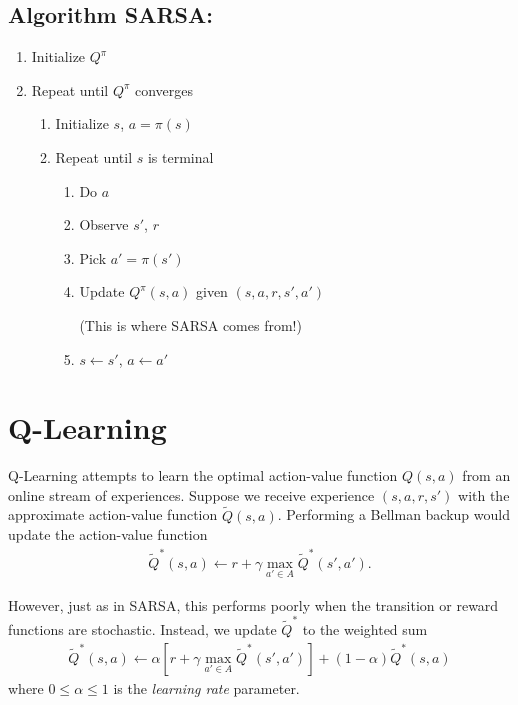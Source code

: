 \documentclass[11pt]{article}
\numberwithin{equation}{section}
\numberwithin{figure}{section}
\begin{document}
\subsection*{Algorithm SARSA:}
\begin{enumerate}
	\item Initialize $Q^\pi$
	\item Repeat until $Q^\pi$ converges
	\begin{enumerate}
		\item Initialize $s$, $a = \pi(s)$
		\item Repeat until $s$ is terminal
		\begin{enumerate}
			\item Do $a$
			\item Observe $s'$, $r$
			\item Pick $a' = \pi(s')$
			\item Update $Q^\pi(s,a)$ given $(s, a, r, s', a')$
			
			(This is where SARSA comes from!)
			\item $s \leftarrow s'$, $a \leftarrow a'$ 
		\end{enumerate}
	\end{enumerate}
\end{enumerate}

\section{Q-Learning}
Q-Learning attempts to learn the optimal action-value function $Q(s, a)$ from
an online stream of experiences. Suppose we receive experience $(s, a, r, s')$
with the approximate action-value function $\tilde{Q}(s, a)$. Performing a
Bellman backup would update the action-value function
\begin{align*}
    \tilde{Q}^*(s, a) \gets r + \gamma \max_{a' \in A} \tilde{Q}^*(s', a').
\end{align*}

However, just as in SARSA, this performs poorly when the transition or reward
functions are stochastic. Instead, we update $\tilde{Q}^*$ to the weighted sum
\begin{align*}
    \tilde{Q}^*(s, a) \gets \alpha \left[r + \gamma \max_{a' \in A} \tilde{Q}^*(s', a')\right]
                            + (1 - \alpha) \tilde{Q}^*(s, a)
\end{align*}
where $0 \le \alpha \le 1$ is the \emph{learning rate} parameter.
\end{document}
